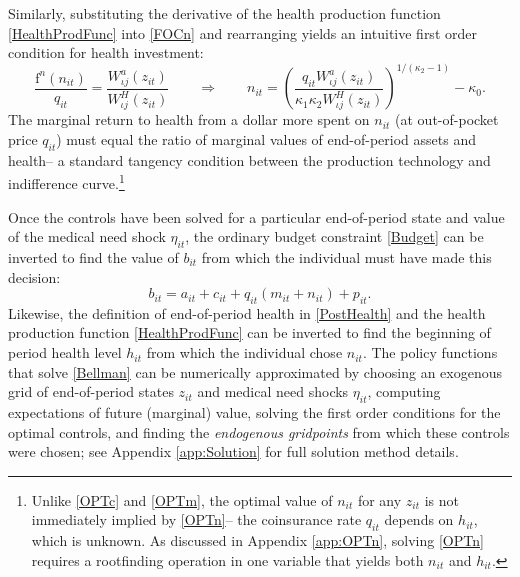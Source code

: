 \documentclass[12pt,pdftex,letterpaper]{article}
\newcommand{\Health}{h}
\newcommand{\PostHealth}{H}
\newcommand{\PostValue}{W}
\newcommand{\Con}{c}
\newcommand{\Care}{m}
\newcommand{\Invst}{n}
\newcommand{\Bank}{b}
\newcommand{\Assets}{a}
\newcommand{\Premium}{p}
\newcommand{\Copay}{q}
\newcommand{\MedShk}{\eta}
\newcommand{\HealthProdFunc}{\text{f}}
\newcommand{\HealthProdParam}{\kappa}
\newcommand{\PostState}{z}
\begin{document}
Similarly, substituting the derivative of the health production function \eqref{HealthProdFunc} into \eqref{FOCn} and rearranging yields an intuitive first order condition for health investment:
\begin{equation}\label{OPTn}
\frac{\HealthProdFunc^\Invst (\Invst_{it})}{\Copay_{it}} = \frac{\PostValue_{\iota j}^\Assets(\PostState_{it})}{\PostValue_{\iota j}^\PostHealth(\PostState_{it})}
\qquad \Longrightarrow \qquad
\Invst_{it} = \left( \frac{\Copay_{it} \PostValue_{\iota j}^\Assets(\PostState_{it})}{\HealthProdParam_1 \HealthProdParam_2 \PostValue_{\iota j}^\PostHealth(\PostState_{it})} \right)^{1/(\HealthProdParam_2 - 1)} - \HealthProdParam_0.
\end{equation}
The marginal return to health from a dollar more spent on $\Invst_{it}$ (at out-of-pocket price $\Copay_{it}$) must equal the ratio of marginal values of end-of-period assets and health-- a standard tangency condition between the production technology and indifference curve.\footnote{Unlike \eqref{OPTc} and \eqref{OPTm}, the optimal value of $\Invst_{it}$ for any $\PostState_{it}$ is not immediately implied by \eqref{OPTn}-- the coinsurance rate $\Copay_{it}$ depends on $\Health_{it}$, which is unknown. As discussed in Appendix \ref{app:OPTn}, solving \eqref{OPTn} requires a rootfinding operation in one variable that yields both $\Invst_{it}$ and $\Health_{it}$.}

Once the controls have been solved for a particular end-of-period state and value of the medical need shock $\MedShk_{it}$, the ordinary budget constraint \eqref{Budget} can be inverted to find the value of $\Bank_{it}$ from which the individual must have made this decision:
\begin{equation}\label{BudgetEGM}
\Bank_{it} = \Assets_{it} + \Con_{it} + \Copay_{it} (\Care_{it} + \Invst_{it}) + \Premium_{it}.
\end{equation}
Likewise, the definition of end-of-period health in \eqref{PostHealth} and the health production function \eqref{HealthProdFunc} can be inverted to find the beginning of period health level $\Health_{it}$ from which the individual chose $\Invst_{it}$.  The policy functions that solve \eqref{Bellman} can be numerically approximated by choosing an exogenous grid of end-of-period states $\PostState_{it}$ and medical need shocks $\MedShk_{it}$, computing expectations of future (marginal) value, solving the first order conditions for the optimal controls, and finding the \textit{endogenous gridpoints} from which these controls were chosen; see Appendix \ref{app:Solution} for full solution method details.
\end{document}
